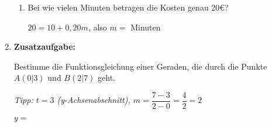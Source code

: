 \begin{enumerate}[label=\arabic*., resume]
\begin{enumerate}[label=\alph*)]
        \item Bei wie vielen Minuten betragen die Kosten genau 20€?
        \vspace{0.3cm}

        $20 = 10 + 0,20m$, also $m =$ \underline{\hspace{2cm}} Minuten
    \end{enumerate}

    \vspace{1cm}

    \item \textbf{Zusatzaufgabe:}

    Bestimme die Funktionsgleichung einer Geraden, die durch die Punkte $A(0|3)$ und $B(2|7)$ geht.

    \textit{Tipp: $t = 3$ (y-Achsenabschnitt), $m = \dfrac{7-3}{2-0} = \dfrac{4}{2} = 2$}

    $y =$ \underline{\hspace{3cm}}

\end{enumerate}